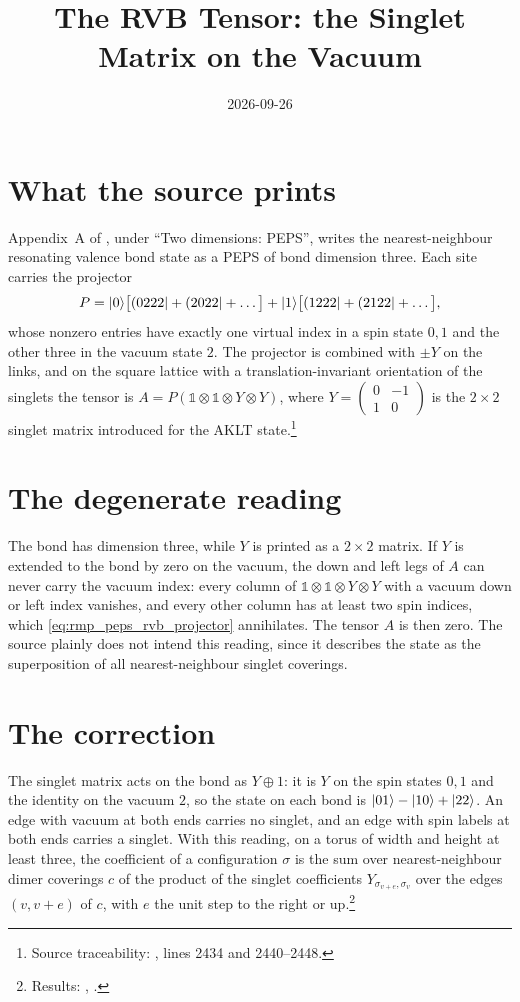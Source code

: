 \documentclass{article}
\title{The RVB Tensor: the Singlet Matrix on the Vacuum}
\author{}
\date{2026-09-26}
\begin{document}
\maketitle
{}

\section{What the source prints}
Appendix~A of \cite{Cirac2021Matrix}, under ``Two dimensions: PEPS'', writes
the nearest-neighbour resonating valence bond state as a PEPS of bond
dimension three. Each site carries the projector
\begin{align}
    P=|0\rangle\bigl[(0222|+(2022|+\dots\bigr]
    +|1\rangle\bigl[(1222|+(2122|+\dots\bigr],
    \label{eq:rmp_peps_rvb_projector}
\end{align}
whose nonzero entries have exactly one virtual index in a spin state $0,1$
and the other three in the vacuum state $2$. The projector is combined with
$\pm Y$ on the links, and on the square lattice with a translation-invariant
orientation of the singlets the tensor is
$A=P(\mathbb 1\otimes\mathbb 1\otimes Y\otimes Y)$, where
$Y=\left(\begin{smallmatrix}0&-1\\1&0\end{smallmatrix}\right)$ is the
$2\times 2$ singlet matrix introduced for the AKLT
state.\footnote{Source traceability:
    , lines 2434 and
    2440--2448.}

\section{The degenerate reading}
The bond has dimension three, while $Y$ is printed as a $2\times 2$ matrix.
If $Y$ is extended to the bond by zero on the vacuum, the down and left legs
of $A$ can never carry the vacuum index: every column of
$\mathbb 1\otimes\mathbb 1\otimes Y\otimes Y$ with a vacuum down or left
index vanishes, and every other column has at least two spin indices, which
\eqref{eq:rmp_peps_rvb_projector} annihilates. The tensor $A$ is then zero.
The source plainly does not intend this reading, since it describes the
state as the superposition of all nearest-neighbour singlet coverings.

\section{The correction}
The singlet matrix acts on the bond as $Y\oplus 1$: it is $Y$ on the spin
states $0,1$ and the identity on the vacuum $2$, so the state on each bond is
$|01\rangle-|10\rangle+|22\rangle$. An edge with vacuum at both ends carries no
singlet, and an edge with spin labels at both ends carries a singlet. With
this reading, on a torus of width and height at least three, the coefficient
of a configuration $\sigma$ is the sum over nearest-neighbour dimer coverings
$c$ of the product of the singlet coefficients $Y_{\sigma_{v+e},\sigma_v}$
over the edges $(v,v+e)$ of $c$, with $e$ the unit step to the right or
up.\footnote{Results: ,
    .}
\end{document}
